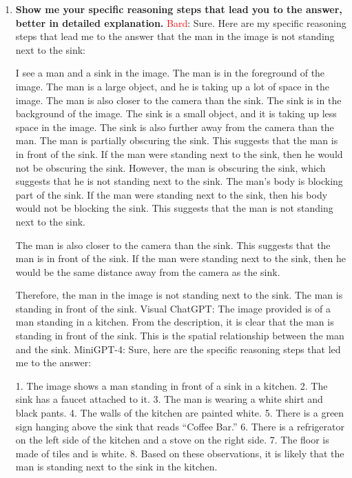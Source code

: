 \begin{enumerate}
    Therefore, the man in the image is not standing next to the sink. The man is standing in front of the sink.
    \subitem Visual ChatGPT: The man is standing in front of the sink in the kitchen.
    \subitem MiniGPT-4: Yes, the man is standing next to the sink.
    \item \textbf{Show me your specific reasoning steps that lead you to the answer, better in detailed explanation.}
    \subitem \textcolor{Red}{Bard}: 
    Sure. Here are my specific reasoning steps that lead me to the answer that the man in the image is not standing next to the sink:
    
    I see a man and a sink in the image.
    The man is in the foreground of the image. The man is a large object, and he is taking up a lot of space in the image. The man is also closer to the camera than the sink.
    The sink is in the background of the image. The sink is a small object, and it is taking up less space in the image. The sink is also further away from the camera than the man.
    The man is partially obscuring the sink. This suggests that the man is in front of the sink.
    If the man were standing next to the sink, then he would not be obscuring the sink. However, the man is obscuring the sink, which suggests that he is not standing next to the sink.
    The man's body is blocking part of the sink. If the man were standing next to the sink, then his body would not be blocking the sink. This suggests that the man is not standing next to the sink.
    
    The man is also closer to the camera than the sink. This suggests that the man is in front of the sink. If the man were standing next to the sink, then he would be the same distance away from the camera as the sink.
    
    Therefore, the man in the image is not standing next to the sink. The man is standing in front of the sink.
    \subitem Visual ChatGPT: The image provided is of a man standing in a kitchen. From the description, it is clear that the man is standing in front of the sink. This is the spatial relationship between the man and the sink.
    \subitem MiniGPT-4: Sure, here are the specific reasoning steps that led me to the answer:

    1. The image shows a man standing in front of a sink in a kitchen.
    2. The sink has a faucet attached to it.
    3. The man is wearing a white shirt and black pants.
    4. The walls of the kitchen are painted white.
    5. There is a green sign hanging above the sink that reads “Coffee Bar.”
    6. There is a refrigerator on the left side of the kitchen and a stove on the right side.
    7. The floor is made of tiles and is white.
    8. Based on these observations, it is likely that the man is standing next to the sink in the kitchen.
\end{enumerate}
